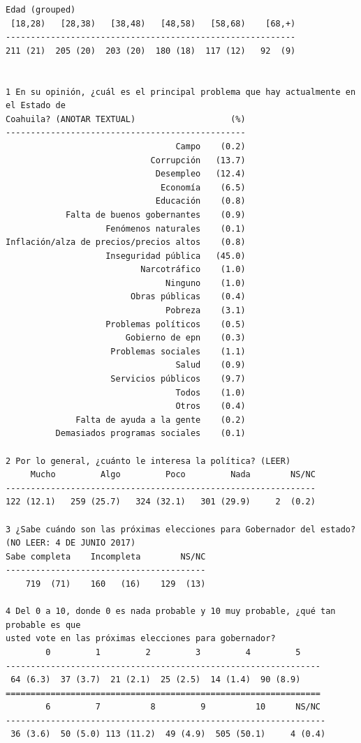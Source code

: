 \documentclass[letter,12pt]{article}
\begin{document}
\begin{scriptsize}
\begin{verbatim}
Edad (grouped)
 [18,28)   [28,38)   [38,48)   [48,58)   [58,68)    [68,+)
----------------------------------------------------------         
211 (21)  205 (20)  203 (20)  180 (18)  117 (12)   92  (9)

 
1 En su opinión, ¿cuál es el principal problema que hay actualmente en el Estado de 
Coahuila? (ANOTAR TEXTUAL)                   (%)
------------------------------------------------
                                  Campo    (0.2) 
                             Corrupción   (13.7) 
                              Desempleo   (12.4) 
                               Economía    (6.5) 
                              Educación    (0.8) 
            Falta de buenos gobernantes    (0.9) 
                    Fenómenos naturales    (0.1) 
Inflación/alza de precios/precios altos    (0.8) 
                    Inseguridad pública   (45.0) 
                           Narcotráfico    (1.0) 
                                Ninguno    (1.0) 
                         Obras públicas    (0.4) 
                                Pobreza    (3.1) 
                    Problemas políticos    (0.5) 
                        Gobierno de epn    (0.3) 
                     Problemas sociales    (1.1) 
                                  Salud    (0.9) 
                     Servicios públicos    (9.7) 
                                  Todos    (1.0) 
                                  Otros    (0.4) 
              Falta de ayuda a la gente    (0.2) 
          Demasiados programas sociales    (0.1) 

2 Por lo general, ¿cuánto le interesa la política? (LEER)
     Mucho         Algo         Poco         Nada        NS/NC
--------------------------------------------------------------
122 (12.1)   259 (25.7)   324 (32.1)   301 (29.9)     2  (0.2) 

3 ¿Sabe cuándo son las próximas elecciones para Gobernador del estado? 
(NO LEER: 4 DE JUNIO 2017)
Sabe completa    Incompleta        NS/NC 
----------------------------------------
    719  (71)    160   (16)    129  (13) 

4 Del 0 a 10, donde 0 es nada probable y 10 muy probable, ¿qué tan probable es que 
usted vote en las próximas elecciones para gobernador?
        0         1         2         3         4         5 
---------------------------------------------------------------
 64 (6.3)  37 (3.7)  21 (2.1)  25 (2.5)  14 (1.4)  90 (8.9)
===============================================================
        6         7          8         9          10      NS/NC
----------------------------------------------------------------
 36 (3.6)  50 (5.0) 113 (11.2)  49 (4.9)  505 (50.1)     4 (0.4) 
         

\end{verbatim}
\end{scriptsize}
\end{document}
